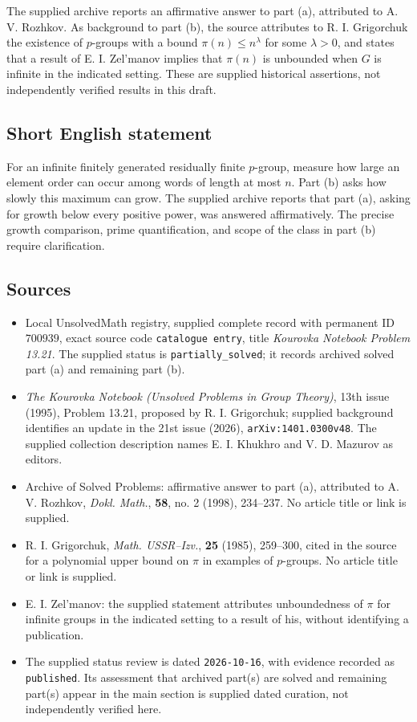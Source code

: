 \documentclass[11pt]{article}
\begin{document}
The supplied archive reports an affirmative answer to part (a), attributed to A. V. Rozhkov. As background to part (b), the source attributes to R. I. Grigorchuk the existence of \(p\)-groups with a bound \(\pi(n)\leq n^\lambda\) for some \(\lambda>0\), and states that a result of E. I. Zel'manov implies that \(\pi(n)\) is unbounded when \(G\) is infinite in the indicated setting. These are supplied historical assertions, not independently verified results in this draft.
\subsection{Short English statement}
For an infinite finitely generated residually finite \(p\)-group, measure how large an element order can occur among words of length at most \(n\). Part (b) asks how slowly this maximum can grow. The supplied archive reports that part (a), asking for growth below every positive power, was answered affirmatively. The precise growth comparison, prime quantification, and scope of the class in part (b) require clarification.
\subsection{Sources}
\begin{itemize}
\item Local UnsolvedMath registry, supplied complete record with permanent ID \(700939\), exact source code \texttt{catalogue entry}, title \emph{Kourovka Notebook Problem 13.21}. The supplied status is \texttt{partially\_solved}; it records archived solved part (a) and remaining part (b).
\item \emph{The Kourovka Notebook (Unsolved Problems in Group Theory)}, 13th issue (1995), Problem 13.21, proposed by R. I. Grigorchuk; supplied background identifies an update in the 21st issue (2026), \texttt{arXiv:1401.0300v48}. The supplied collection description names E. I. Khukhro and V. D. Mazurov as editors.
\item Archive of Solved Problems: affirmative answer to part (a), attributed to A. V. Rozhkov, \emph{Dokl. Math.}, \textbf{58}, no. 2 (1998), 234--237. No article title or link is supplied.
\item R. I. Grigorchuk, \emph{Math. USSR--Izv.}, \textbf{25} (1985), 259--300, cited in the source for a polynomial upper bound on \(\pi\) in examples of \(p\)-groups. No article title or link is supplied.
\item E. I. Zel'manov: the supplied statement attributes unboundedness of \(\pi\) for infinite groups in the indicated setting to a result of his, without identifying a publication.
\item The supplied status review is dated \texttt{2026-10-16}, with evidence recorded as \texttt{published}. Its assessment that archived part(s) are solved and remaining part(s) appear in the main section is supplied dated curation, not independently verified here.
\end{itemize}
\end{document}
